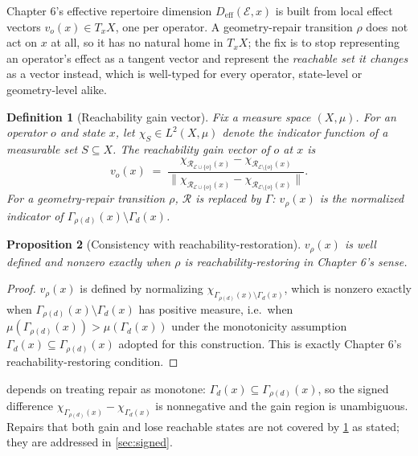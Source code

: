 \documentclass[12pt]{report}
\newtheorem{definition}{Definition}[section]
\newtheorem{proposition}[definition]{Proposition}
\begin{document}
Chapter 6's effective repertoire dimension $D_{\mathrm{eff}}(\mathcal{E},x)$
is built from local effect vectors $v_o(x) \in T_xX$, one per operator.
A geometry-repair transition $\rho$ does not act on $x$ at all, so it
has no natural home in $T_xX$; the fix is to stop representing an
operator's effect as a tangent vector and represent the \emph{reachable
set it changes} as a vector instead, which is well-typed for every
operator, state-level or geometry-level alike.

\begin{definition}[Reachability gain vector]
\label{def:gain-vector}
Fix a measure space $(X,\mu)$. For an operator $o$ and state $x$, let
$\chi_S \in L^2(X,\mu)$ denote the indicator function of a measurable
set $S \subseteq X$. The \emph{reachability gain vector} of $o$ at $x$ is
\[
v_o(x) \;=\; \frac{\chi_{\mathcal{R}_{\mathcal{E}\cup\{o\}}(x)} -
\chi_{\mathcal{R}_{\mathcal{E}\setminus\{o\}}(x)}}
{\bigl\| \chi_{\mathcal{R}_{\mathcal{E}\cup\{o\}}(x)} -
\chi_{\mathcal{R}_{\mathcal{E}\setminus\{o\}}(x)} \bigr\|}.
\]
For a geometry-repair transition $\rho$, $\mathcal{R}$ is replaced by
$\Gamma$: $v_\rho(x)$ is the normalized indicator of
$\Gamma_{\rho(d)}(x) \setminus \Gamma_d(x)$.
\end{definition}

\begin{proposition}[Consistency with reachability-restoration]
\label{prop:gain-consistency}
$v_\rho(x)$ is well defined and nonzero exactly when $\rho$ is
reachability-restoring in Chapter 6's sense.
\end{proposition}

\begin{proof}
$v_\rho(x)$ is defined by normalizing $\chi_{\Gamma_{\rho(d)}(x)
\setminus \Gamma_d(x)}$, which is nonzero exactly when
$\Gamma_{\rho(d)}(x) \setminus \Gamma_d(x)$ has positive measure, i.e.\
when $\mu(\Gamma_{\rho(d)}(x)) > \mu(\Gamma_d(x))$ under the monotonicity
assumption $\Gamma_d(x) \subseteq \Gamma_{\rho(d)}(x)$ adopted for this
construction. This is exactly Chapter 6's reachability-restoring
condition.
\end{proof}

 depends on treating repair as monotone:
$\Gamma_d(x) \subseteq \Gamma_{\rho(d)}(x)$, so the signed difference
$\chi_{\Gamma_{\rho(d)}(x)} - \chi_{\Gamma_d(x)}$ is nonnegative and the
gain region is unambiguous. Repairs that both gain and lose reachable
states are not covered by \cref{def:gain-vector} as stated; they are
addressed in \cref{sec:signed}.
\end{document}

